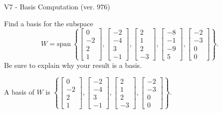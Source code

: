 \begin{exercise}
  \begin{exerciseTitle}V7 - Basis Computation (ver. 976)\end{exerciseTitle}
  \begin{exerciseStatement}
    Find a basis for the subspace 
\[W=\mathrm{span}\ \left\{\left[\begin{array}{r}
0 \\
-2 \\
2 \\
1
\end{array}\right] , \left[\begin{array}{r}
-2 \\
-4 \\
3 \\
-1
\end{array}\right] , \left[\begin{array}{r}
2 \\
1 \\
2 \\
-3
\end{array}\right] , \left[\begin{array}{r}
-8 \\
-1 \\
-9 \\
5
\end{array}\right] , \left[\begin{array}{r}
-2 \\
-3 \\
0 \\
0
\end{array}\right]\right\}.\]
 Be sure to explain why your result is a basis.


  \end{exerciseStatement}
  \begin{exerciseAnswer}
   A basis of \(W\) is  \(\left\{\left[\begin{array}{r}
0 \\
-2 \\
2 \\
1
\end{array}\right] , \left[\begin{array}{r}
-2 \\
-4 \\
3 \\
-1
\end{array}\right] , \left[\begin{array}{r}
2 \\
1 \\
2 \\
-3
\end{array}\right] , \left[\begin{array}{r}
-2 \\
-3 \\
0 \\
0
\end{array}\right]\right\}\).
  


  \end{exerciseAnswer}
\end{exercise}